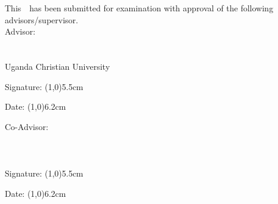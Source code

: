 
This~\theTheDocumentType~has been submitted for examination with approval of the following advisors/supervisor.\\


Advisor: \thePrimaryAdvisor \\
\theDepartment\\
\theFaculty\\
Uganda Christian University\\

\vspace{1.5cm}

Signature: \line(1,0){5.5cm}\par
\vspace{1.5cm}

Date:	\line(1,0){6.2cm}\par

\vspace{1.5cm}



Co-Advisor: \theOtherAdvisor \\
\theOtherAdvisorDepartment \\
\theOtherAdvisorFaculty \\
\theOtherAdvisorUniversity \\
\vspace{1.5cm}
Signature: \line(1,0){5.5cm}\par
\vspace{1.5cm}
Date:	\line(1,0){6.2cm}\par



